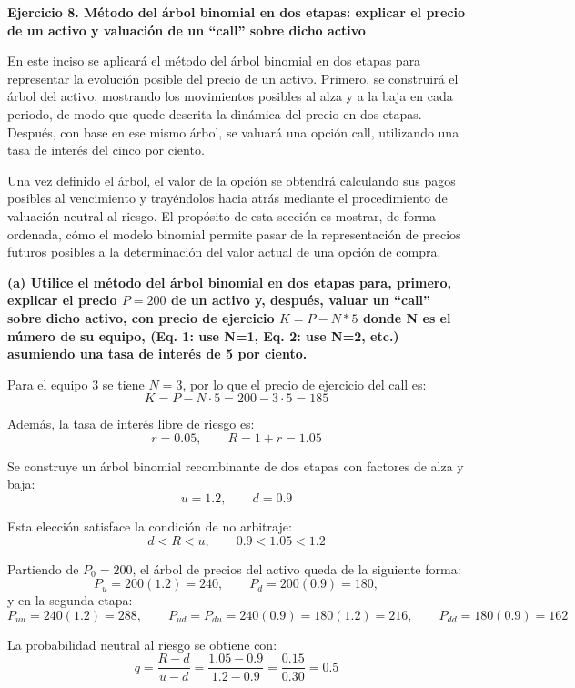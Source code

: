 \documentclass{article}\usepackage[]{graphicx}\usepackage[]{xcolor}
\begin{document}
\newpage
{\large\bfseries Ejercicio 8. Método del árbol binomial en dos etapas: explicar el precio de un activo y valuación de un ``call'' sobre dicho activo}
\vspace{0.2cm}

En este inciso se aplicará el método del árbol binomial en dos etapas para representar la evolución posible del precio de un activo. Primero, se construirá el árbol del activo, mostrando los movimientos posibles al alza y a la baja en cada periodo, de modo que quede descrita la dinámica del precio en dos etapas. Después, con base en ese mismo árbol, se valuará una opción call, utilizando una tasa de interés del cinco por ciento.

Una vez definido el árbol, el valor de la opción se obtendrá calculando sus pagos posibles al vencimiento y trayéndolos hacia atrás mediante el procedimiento de valuación neutral al riesgo. El propósito de esta sección es mostrar, de forma ordenada, cómo el modelo binomial permite pasar de la representación de precios futuros posibles a la determinación del valor actual de una opción de compra.
\vspace{0.3cm}

\textbf{(a) Utilice el método del árbol binomial en dos etapas para, primero, explicar el precio \(P = 200\) de un activo y, después, valuar un ``call'' sobre dicho activo, con precio de ejercicio \(K=P-N*5\) donde N es el número de su equipo, (Eq. 1: use N=1, Eq. 2: use N=2, etc.) asumiendo una tasa de interés de 5 por ciento.}

Para el equipo 3 se tiene \(N=3\), por lo que el precio de ejercicio del call es:
\[
K=P-N\cdot 5=200-3\cdot 5=185
\]

Además, la tasa de interés libre de riesgo es:
\[
r=0.05,
\qquad R=1+r=1.05
\]

Se construye un árbol binomial recombinante de dos etapas con factores de alza y baja:
\[
u=1.2,
\qquad d=0.9
\]

Esta elección satisface la condición de no arbitraje:
\[
d<R<u,
\qquad 0.9 < 1.05 < 1.2
\]

Partiendo de \(P_0=200\), el árbol de precios del activo queda de la siguiente forma:
\[
P_u=200 (1.2)=240,
\qquad
P_d=200 (0.9)=180,
\]
y en la segunda etapa:
\[
P_{uu}=240 (1.2)=288,
\qquad
P_{ud}=P_{du}=240 (0.9)=180 (1.2)=216,
\qquad
P_{dd}=180 (0.9)=162
\]

La probabilidad neutral al riesgo se obtiene con:
\[
q=\frac{R-d}{u-d}
=\frac{1.05-0.9}{1.2-0.9}
=\frac{0.15}{0.30}=0.5
\]
\end{document}
